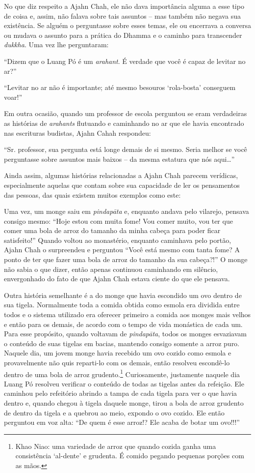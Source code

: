 No que diz respeito a Ajahn Chah, ele não dava importância alguma a esse
tipo de coisa e, assim, não falava sobre tais assuntos -- mas também não
negava sua existência. Se alguém o perguntasse sobre esses temas, ele ou
encerrava a conversa ou mudava o assunto para a prática do Dhamma e o
caminho para transcender \emph{dukkha}. Uma vez lhe perguntaram:

``Dizem que o Luang Pó é um \emph{arahant}. É verdade que você é capaz
de levitar no ar?''

``Levitar no ar não é importante; até mesmo besouros `rola-bosta'
conseguem voar!''

Em outra ocasião, quando um professor de escola perguntou se eram
verdadeiras as histórias de \emph{arahants} flutuando e caminhando no ar
que ele havia encontrado nas escrituras budistas, Ajahn Cahah respondeu:

``Sr. professor, sua pergunta está longe demais de si mesmo. Seria
melhor se você perguntasse sobre assuntos mais baixos -- da mesma
estatura que nós aqui\ldots{}''

Ainda assim, algumas histórias relacionadas a Ajahn Chah parecem
verídicas, especialmente aquelas que contam sobre sua capacidade de ler
os pensamentos das pessoas, das quais existem muitos exemplos como este:

Uma vez, um monge saiu em \emph{pindapāta} e, enquanto andava pelo
vilarejo, pensava consigo mesmo: ``Hoje estou com muita fome! Vou comer
muito, vou ter que comer uma bola de arroz do tamanho da minha cabeça
para poder ficar satisfeito!'' Quando voltou ao monastério, enquanto
caminhava pelo portão, Ajahn Chah o surpreendeu e perguntou ``Você está
mesmo com tanta fome? A ponto de ter que fazer uma bola de arroz do
tamanho da sua cabeça?!'' O monge não sabia o que dizer, então apenas
continuou caminhando em silêncio, envergonhado do fato de que Ajahn Chah
estava ciente do que ele pensava.

Outra história semelhante é a do monge que havia escondido um ovo dentro
de sua tigela. Normalmente toda a comida obtida como esmola era dividida
entre todos e o sistema utilizado era oferecer primeiro a comida aos
monges mais velhos e então para os demais, de acordo com o tempo de vida
monástica de cada um. Para esse propósito, quando voltavam de
\emph{pindapāta}, todos os monges esvaziavam o conteúdo de suas tigelas
em bacias, mantendo consigo somente a arroz puro. Naquele dia, um jovem
monge havia recebido um ovo cozido como esmola e provavelmente não quis
reparti-lo com os demais, então resolveu escondê-lo dentro de uma bola
de arroz grudento.\footnote{Khao Niao: uma variedade de arroz que quando
  cozida ganha uma consistência `al-dente' e grudenta. É comido pegando
  pequenas porções com as mãos.} Curiosamente, justamente naquele dia
Luang Pó resolveu verificar o conteúdo de todas as tigelas antes da
refeição. Ele caminhou pelo refeitório abrindo a tampa de cada tigela
para ver o que havia dentro e, quando chegou à tigela daquele monge,
tirou a bola de arroz grudento de dentro da tigela e a quebrou ao meio,
expondo o ovo cozido. Ele então perguntou em voz alta: ``De quem é esse
arroz!? Ele acaba de botar um ovo!!!''

